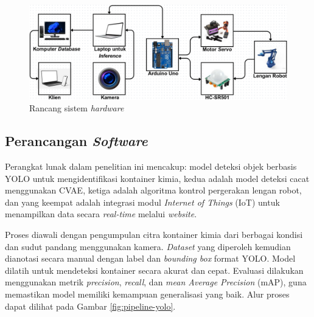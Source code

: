 \begin{figure}[H]
  \centering
  \includegraphics[width=\textwidth]{gambar/rancang.png}
  \caption{Rancang sistem \textit{hardware}}
  \label{fig:hardware}
\end{figure}
\vspace{-1em}

\vspace{1em}

\subsection{Perancangan \textit{Software}}
Perangkat lunak dalam penelitian ini mencakup: model deteksi objek
berbasis YOLO untuk mengidentifikasi kontainer kimia, kedua adalah
model deteksi cacat menggunakan CVAE, ketiga adalah algoritma kontrol
pergerakan lengan robot, dan yang keempat adalah integrasi modul
\textit{Internet of Things} (IoT) untuk menampilkan data secara
\textit{real-time} melalui \textit{website}.

Proses diawali dengan pengumpulan citra kontainer kimia dari berbagai
kondisi dan sudut pandang menggunakan kamera. \textit{Dataset} yang
diperoleh kemudian dianotasi secara manual dengan label dan
\textit{bounding box} format YOLO. Model dilatih untuk mendeteksi
kontainer secara akurat dan cepat. Evaluasi dilakukan menggunakan metrik
\textit{precision}, \textit{recall}, dan \textit{mean Average
Precision} (mAP), guna memastikan model memiliki kemampuan
generalisasi yang baik. Alur proses dapat dilihat pada Gambar
\ref{fig:pipeline-yolo}.


